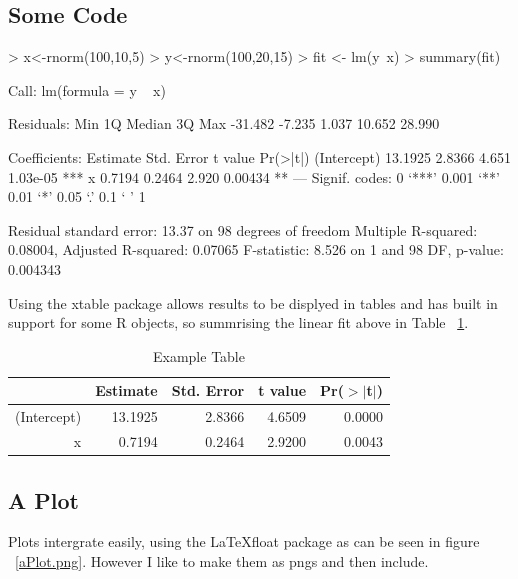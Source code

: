 \documentclass[a4paper]{article}
\begin{document}
\subsection{Some Code}
\begin{Schunk}
\begin{Sinput}
> x<-rnorm(100,10,5)
> y<-rnorm(100,20,15)
> fit <- lm(y~x)
> summary(fit)
\end{Sinput}
\begin{Soutput}
Call:
lm(formula = y ~ x)

Residuals:
    Min      1Q  Median      3Q     Max 
-31.482  -7.235   1.037  10.652  28.990 

Coefficients:
            Estimate Std. Error t value Pr(>|t|)    
(Intercept)  13.1925     2.8366   4.651 1.03e-05 ***
x             0.7194     0.2464   2.920  0.00434 ** 
---
Signif. codes:  0 ‘***’ 0.001 ‘**’ 0.01 ‘*’ 0.05 ‘.’ 0.1 ‘ ’ 1 

Residual standard error: 13.37 on 98 degrees of freedom
Multiple R-squared: 0.08004,	Adjusted R-squared: 0.07065 
F-statistic: 8.526 on 1 and 98 DF,  p-value: 0.004343 
\end{Soutput}
\end{Schunk}
Using the xtable package allows results to be displyed in tables and has built in support for some R objects, so summrising the linear fit above in Table ~\ref{ATable}.
\begin{table}[ht]
\begin{center}
\begin{tabular}{rrrrr}
  \hline
 & Estimate & Std. Error & t value & Pr($>$$|$t$|$) \\ 
  \hline
(Intercept) & 13.1925 & 2.8366 & 4.6509 & 0.0000 \\ 
  x & 0.7194 & 0.2464 & 2.9200 & 0.0043 \\ 
   \hline
\end{tabular}
\caption{Example Table}
\label{ATable}
\end{center}
\end{table}\subsection{A Plot}
 
Plots intergrate easily, using the \LaTeX float package as can be seen in figure ~\ref{aPlot.png}.  However I like to make them as pngs and then include.
\end{document}
